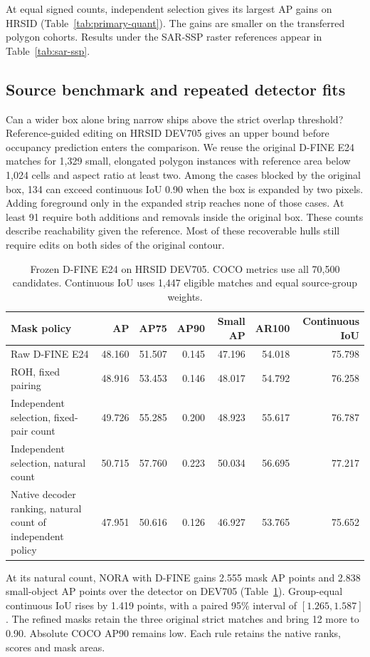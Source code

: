 \documentclass[journal]{IEEEtran}
\begin{document}
At equal signed counts, independent selection gives its largest AP gains on HRSID (Table~\ref{tab:primary-quant}). The gains are smaller on the transferred polygon cohorts. Results under the SAR-SSP raster references appear in Table~\ref{tab:sar-ssp}.

\subsection{Source benchmark and repeated detector fits}

Can a wider box alone bring narrow ships above the strict overlap threshold? Reference-guided editing on HRSID DEV705 gives an upper bound before occupancy prediction enters the comparison. We reuse the original D-FINE E24 matches for 1,329 small, elongated polygon instances with reference area below 1,024 cells and aspect ratio at least two. Among the cases blocked by the original box, 134 can exceed continuous IoU 0.90 when the box is expanded by two pixels. Adding foreground only in the expanded strip reaches none of those cases. At least 91 require both additions and removals inside the original box. These counts describe reachability given the reference. Most of these recoverable hulls still require edits on both sides of the original contour.
\begin{table}[t]
\centering
\caption{Frozen D-FINE E24 on HRSID DEV705. COCO metrics use all 70,500 candidates. Continuous IoU uses 1,447 eligible matches and equal source-group weights.}
\label{tab:dev}
\begin{tabular}{lrrrrrr}
\toprule
Mask policy & AP & AP75 & AP90 & Small AP & AR100 & Continuous IoU\\
\midrule
Raw D-FINE E24 & 48.160 & 51.507 & 0.145 & 47.196 & 54.018 & 75.798\\
ROH, fixed pairing & 48.916 & 53.453 & 0.146 & 48.017 & 54.792 & 76.258\\
Independent selection, fixed-pair count & 49.726 & 55.285 & 0.200 & 48.923 & 55.617 & 76.787\\
\midrule
Independent selection, natural count & 50.715 & 57.760 & 0.223 & 50.034 & 56.695 & 77.217\\
Native decoder ranking, natural count of independent policy & 47.951 & 50.616 & 0.126 & 46.927 & 53.765 & 75.652\\
\bottomrule
\end{tabular}
\end{table}

At its natural count, NORA with D-FINE gains 2.555 mask AP points and 2.838 small-object AP points over the detector on DEV705 (Table~\ref{tab:dev}). Group-equal continuous IoU rises by 1.419 points, with a paired 95\% interval of \([1.265,1.587]\). The refined masks retain the three original strict matches and bring 12 more to 0.90. Absolute COCO AP90 remains low. Each rule retains the native ranks, scores and mask areas.
\end{document}
